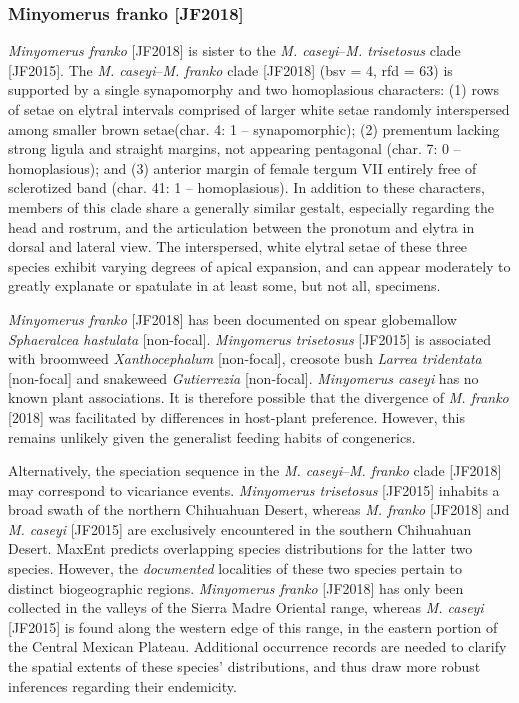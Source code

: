 \documentclass[fleqn,10pt,lineno]{wlpeerj} %
\begin{document}
		\subsubsection*{Minyomerus franko \textnormal{\bfseries[JF2018]}}
			\textit{Minyomerus franko} [JF2018] is sister to the \textit{M. caseyi}--\textit{M. trisetosus} clade [JF2015].
			The \textit{M. caseyi}--\textit{M. franko} clade [JF2018] (bsv = 4, rfd = 63) is supported by a single synapomorphy and two homoplasious characters: (1) rows of setae on elytral intervals comprised of larger white setae randomly interspersed among smaller brown setae(char. 4: 1 -- synapomorphic); (2) prementum lacking strong ligula and straight margins, not appearing pentagonal (char. 7: 0 -- homoplasious); and (3) anterior margin of female tergum VII entirely free of sclerotized band (char. 41: 1 -- homoplasious).
			In addition to these characters, members of this clade share a generally similar gestalt, especially regarding the head and rostrum, and the articulation between the pronotum and elytra in dorsal and lateral view.
			The interspersed, white elytral setae of these three species exhibit varying degrees of apical expansion, and can appear moderately to greatly explanate or spatulate in at least some, but not all, specimens.
			
			\textit{Minyomerus franko} [JF2018] has been documented on spear globemallow \textit{Sphaeralcea hastulata} [non-focal]. \textit{Minyomerus trisetosus} [JF2015] is associated with broomweed \textit{Xanthocephalum} [non-focal], creosote bush \textit{Larrea tridentata} [non-focal] and snakeweed \textit{Gutierrezia} [non-focal]. \textit{Minyomerus caseyi} has no known plant associations.
			It is therefore possible that the divergence of \textit{M. franko} [2018] was facilitated by differences in host-plant preference.
			However, this remains unlikely given the generalist feeding habits of congenerics.
			
			Alternatively, the speciation sequence in the \textit{M. caseyi}--\textit{M. franko} clade [JF2018] may correspond to vicariance events.
			\textit{Minyomerus trisetosus} [JF2015] inhabits a broad swath of the northern Chihuahuan Desert, whereas \textit{M. franko} [JF2018] and \textit{M. caseyi} [JF2015] are exclusively encountered in the southern Chihuahuan Desert.
			MaxEnt predicts overlapping species distributions for the latter two species.
			However, the \emph{documented} localities of these two species pertain to distinct biogeographic regions.
			\textit{Minyomerus franko} [JF2018] has only been collected in the valleys of the Sierra Madre Oriental range, whereas \textit{M. caseyi} [JF2015] is found along the western edge of this range, in the eastern portion of the Central Mexican Plateau.
			Additional occurrence records are needed to clarify the spatial extents of these species' distributions, and thus draw more robust inferences regarding their endemicity.
			
\end{document}
